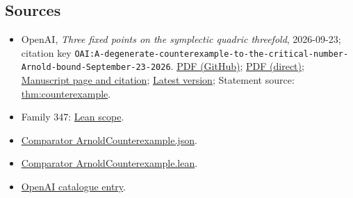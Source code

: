 \documentclass[11pt]{article}
\begin{document}
\subsection{Sources}
\begin{itemize}
\item OpenAI, \emph{Three fixed points on the symplectic quadric threefold}, 2026-09-23; citation key \texttt{OAI:A-degenerate-counterexample-to-the-critical-number-Arnold-bound-September-23-2026}. \href{https://github.com/openai/math/blob/adc7f1241b42e322a6451854ab7e4b4c146bf78a/preprints/A-degenerate-counterexample-to-the-critical-number-Arnold-bound-September-23-2026/paper.pdf}{PDF (GitHub)}; \href{https://github.com/openai/math/raw/adc7f1241b42e322a6451854ab7e4b4c146bf78a/preprints/A-degenerate-counterexample-to-the-critical-number-Arnold-bound-September-23-2026/paper.pdf}{PDF (direct)}; \href{https://github.com/openai/math/blob/adc7f1241b42e322a6451854ab7e4b4c146bf78a/preprints/A-degenerate-counterexample-to-the-critical-number-Arnold-bound-September-23-2026/README.md}{Manuscript page and citation}; \href{https://github.com/openai/math/blob/main/preprints/A-degenerate-counterexample-to-the-critical-number-Arnold-bound-September-23-2026/paper.pdf}{Latest version}; Statement source: \href{https://github.com/openai/math/blob/adc7f1241b42e322a6451854ab7e4b4c146bf78a/preprints/A-degenerate-counterexample-to-the-critical-number-Arnold-bound-September-23-2026/build/sections/00-introduction.tex\#L56}{thm:counterexample}.
\item Family 347: \href{https://github.com/openai/math/blob/adc7f1241b42e322a6451854ab7e4b4c146bf78a/lean/docs/347.md}{Lean scope}.
\item \href{https://github.com/openai/math/blob/adc7f1241b42e322a6451854ab7e4b4c146bf78a/lean/ComparatorChallenges/ArnoldCounterexample.json}{Comparator ArnoldCounterexample.json}.
\item \href{https://github.com/openai/math/blob/adc7f1241b42e322a6451854ab7e4b4c146bf78a/lean/ComparatorChallenges/ArnoldCounterexample.lean}{Comparator ArnoldCounterexample.lean}.
\item \href{https://github.com/openai/math/blob/adc7f1241b42e322a6451854ab7e4b4c146bf78a/CONTENTS.md}{OpenAI catalogue entry}.
\end{itemize}
\end{document}
